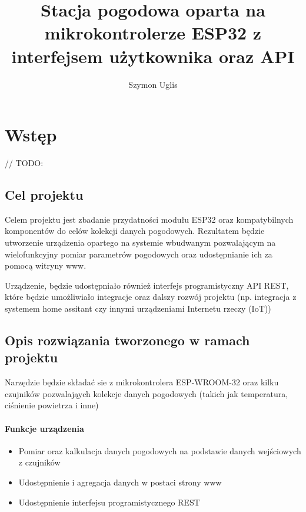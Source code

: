 \documentclass[12pt,a4paper]{article}
\title{Stacja pogodowa oparta na mikrokontrolerze ESP32 z interfejsem użytkownika oraz API}
\author{Szymon Uglis}
\begin{document}
\begin{titlepage}
    \maketitle
\end{titlepage}

\tableofcontents{}
\pagebreak

\section{Wstęp}

// TODO:

\subsection{Cel projektu}

Celem projektu jest zbadanie przydatności modułu ESP32 oraz kompatybilnych komponentów do celów kolekcji danych pogodowych. 
Rezultatem będzie utworzenie urządzenia opartego na systemie wbudwanym pozwalającym na wielofunkcyjny pomiar parametrów pogodowych oraz udostępnianie ich za pomocą witryny www.

Urządzenie, będzie udostępniało również interfejs programistyczny API REST, które będzie umożliwiało integracje oraz dalszy rozwój projektu 
(np. integracja z systemem home assitant czy innymi urządzeniami Internetu rzeczy (IoT))

\subsection{Opis rozwiązania tworzonego w ramach projektu}

Narzędzie będzie składać sie z mikrokontrolera ESP-WROOM-32 oraz kilku czujników pozwalająych kolekcje danych pogodowych (takich jak temperatura, ciśnienie powietrza i inne)

\paragraph{Funkcje urządzenia}
\begin{itemize}
    \item Pomiar oraz kalkulacja danych pogodowych na podstawie danych wejściowych z czujników
    \item Udostępnienie i agregacja danych w postaci strony www
    \item Udostępnienie interfejsu programistycznego REST 
\end{itemize}
\end{document}
